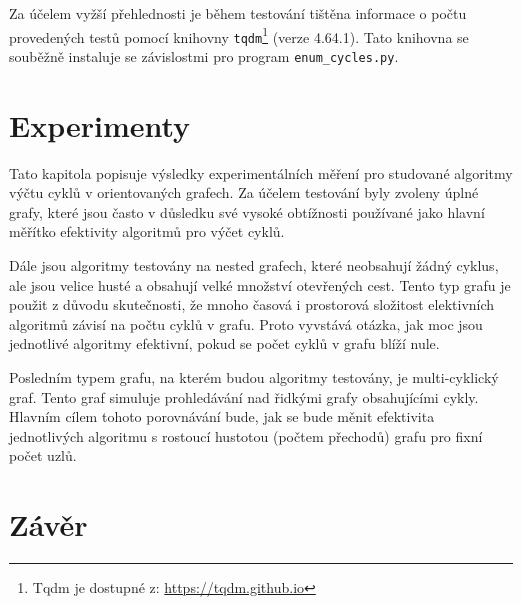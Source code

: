         Za účelem vyžší přehlednosti je během testování tištěna informace o počtu provedených testů pomocí knihovny \texttt{tqdm}\footnote{Tqdm je dostupné z: \url{https://tqdm.github.io}} (verze 4.64.1). Tato knihovna se souběžně instaluje se závislostmi pro program \texttt{enum\_cycles.py}.


\chapter{Experimenty}
    \label{chapter:Experiments}
    Tato kapitola popisuje výsledky experimentálních měření pro studované algoritmy výčtu cyklů v orientovaných grafech. Za účelem testování byly zvoleny úplné grafy, které jsou často v důsledku své vysoké obtížnosti používané jako hlavní měřítko efektivity algoritmů pro výčet cyklů.

    Dále jsou algoritmy testovány na nested grafech, které neobsahují žádný cyklus, ale jsou velice husté a obsahují velké množství otevřených cest. Tento typ grafu je použit z důvodu skutečnosti, že mnoho časová i prostorová složitost elektivních algoritmů závisí na počtu cyklů v grafu. Proto vyvstává otázka, jak moc jsou jednotlivé algoritmy efektivní, pokud se počet cyklů v grafu blíží nule.

    Posledním typem grafu, na kterém budou algoritmy testovány, je multi-cyklický graf. Tento graf simuluje prohledávání nad řidkými grafy obsahujícími cykly. Hlavním cílem tohoto porovnávání bude, jak se bude měnit efektivita jednotlivých algoritmu s rostoucí hustotou (počtem přechodů) grafu pro fixní počet uzlů.

\chapter{Závěr}
    \label{chapter:Conclusion}
    \lipsum[2]

